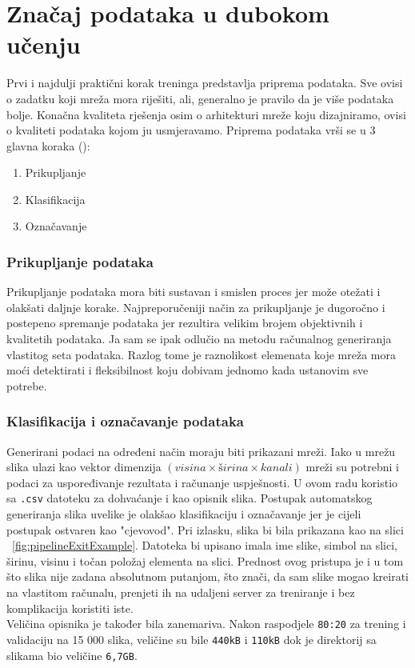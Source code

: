 \section{Značaj podataka u dubokom učenju}
Prvi i najdulji praktični korak treninga predstavlja priprema podataka. 
Sve ovisi o zadatku koji mreža mora riješiti, ali, generalno je pravilo da je više podataka bolje.
Konačna kvaliteta rješenja osim o arhitekturi mreže koju dizajniramo, ovisi o kvaliteti podataka kojom ju usmjeravamo.
Priprema podataka vrši se u 3 glavna koraka (\cite{generalDatasets}):
\begin{enumerate}
\item Prikupljanje
\item Klasifikacija
\item Označavanje
\end{enumerate} 
\subsubsection{Prikupljanje podataka}
Prikupljanje podataka mora biti sustavan i smislen proces jer može otežati i olakšati daljnje korake. 
Najpreporučeniji način za prikupljanje je dugoročno i postepeno spremanje podataka jer rezultira velikim brojem objektivnih i kvalitetih podataka.
Ja sam se ipak odlučio na metodu računalnog generiranja vlastitog seta podataka. 
Razlog tome je raznolikost elemenata koje mreža mora moći detektirati i fleksibilnost koju dobivam jednomo kada ustanovim sve potrebe.
\subsubsection{Klasifikacija i označavanje podataka}
Generirani podaci na određeni način moraju biti prikazani mreži. 
Iako u mrežu slika ulazi kao vektor dimenzija $(visina \times širina \times kanali)$ mreži su potrebni i podaci za uspoređivanje rezultata i računanje uspješnosti.
U ovom radu koristio sa \texttt{.csv} datoteku za dohvaćanje i kao opisnik slika. 
Postupak automatskog generiranja slika uvelike je olakšao klasifikaciju i označavanje jer je cijeli postupak ostvaren kao "cjevovod".
Pri izlasku, slika bi bila prikazana kao na slici ~\ref{fig:pipelineExitExample}.
Datoteka bi upisano imala ime slike, simbol na slici, širinu, visinu i točan položaj elementa na slici. 
Prednost ovog pristupa je i u tom što slika nije zadana absolutnom putanjom, što znači, da sam slike mogao kreirati na vlastitom računalu, prenjeti ih na udaljeni server za treniranje i bez komplikacija koristiti iste. \\
Veličina opisnika je također bila zanemariva. 
Nakon raspodjele \texttt{80:20} za trening i validaciju na 15 000 slika, veličine su bile \texttt{440kB} i \texttt{110kB} dok je direktorij sa slikama bio veličine \texttt{6,7GB}.

